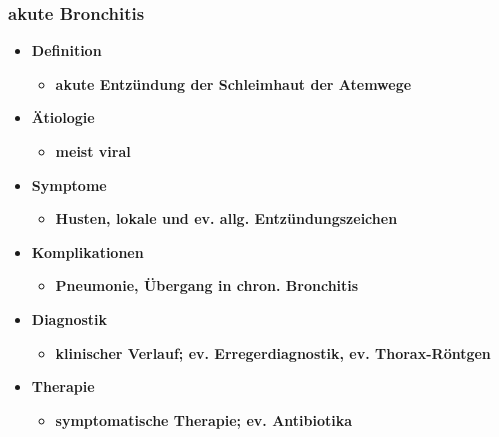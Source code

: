 \begin{itemize}
	\subsubsection{akute Bronchitis}
		\begin{itemize}
			\item \textbf{Definition}
				\begin{itemize}
					\item \textbf{akute Entzündung der Schleimhaut der Atemwege}
				\end{itemize}
			\item \textbf{Ätiologie}
				\begin{itemize}
					\item \textbf{meist viral}
				\end{itemize}
			\item \textbf{Symptome}
				\begin{itemize}
					\item \textbf{Husten, lokale und ev. allg. Entzündungszeichen}
				\end{itemize}
			\item \textbf{Komplikationen}
				\begin{itemize}
					\item \textbf{Pneumonie, Übergang in chron. Bronchitis}
				\end{itemize}
			\item \textbf{Diagnostik}
				\begin{itemize}
					\item \textbf{klinischer Verlauf; ev. Erregerdiagnostik, ev. Thorax-Röntgen}
				\end{itemize}
			\item \textbf{Therapie}
				\begin{itemize}
					\item \textbf{symptomatische Therapie; ev. Antibiotika}
				\end{itemize}
		\end{itemize}

\end{itemize}
